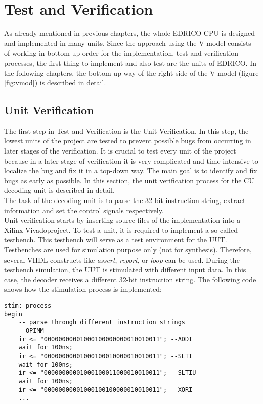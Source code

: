 \chapter{Test and Verification}
As already mentioned in previous chapters, the whole EDRICO CPU is designed and implemented in many units. Since the approach using the V-model consists of working in bottom-up order for the implementation, test and verification processes, the first thing to implement and also test are the units of EDRICO. In the following chapters, the bottom-up way of the right side of the V-model (figure \ref{fig:vmod}) is described in detail.
\section{Unit Verification}
The first step in Test and Verification is the Unit Verification. In this step, the lowest units of the project are tested to prevent possible bugs from occurring in later stages of the verification. It is crucial to test every unit of the project because in a later stage of verification it is very complicated and time intensive to localize the bug and fix it in a top-down way. The main goal is to identify and fix bugs as early as possible. In this section, the unit verification process for the CU decoding unit is described in detail.\\
The task of the decoding unit is to parse the 32-bit instruction string, extract information and set the control signals respectively.\\
Unit verification starts by inserting source files of the implementation into a Xilinx Vivado\textcopyright  project. To test a unit, it is required to implement a so called testbench. This testbench will serve as a test environment for the \ac{UUT}. Testbenches are used for simulation purpose only (not for synthesis). Therefore, several VHDL constructs like \textit{assert}, \textit{report}, or \textit{loop} can be used. During the testbench simulation, the UUT is stimulated with different input data. In this case, the decoder receives a different 32-bit instruction string. The following code shows how the stimulation process is implemented:
\begin{lstlisting}[style=vhdl, caption=CU testbench stimulation process]
stim: process
begin
	-- parse through different instruction strings
	--OPIMM
	ir <= "00000000001000100000000010010011"; --ADDI
	wait for 100ns;
	ir <= "00000000001000100010000010010011"; --SLTI
	wait for 100ns;
	ir <= "00000000001000100011000010010011"; --SLTIU
	wait for 100ns;
	ir <= "00000000001000100100000010010011"; --XORI
	...
\end{lstlisting}
